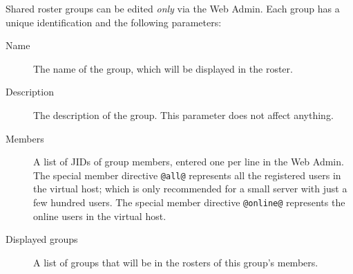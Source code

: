 \documentclass[a4paper,10pt]{book}
\newcommand{\term}[1]{\texttt{#1}}
\begin{document}
Shared roster groups can be edited \emph{only} via the Web Admin. Each group
has a unique identification and the following parameters:
\begin{description}
\item[Name] The name of the group, which will be displayed in the roster.
\item[Description] The description of the group. This parameter does not affect
  anything.
\item[Members] A list of JIDs of group members, entered one per line in
  the Web Admin.
  The special member directive \term{@all@}
  represents all the registered users in the virtual host;
  which is only recommended for a small server with just a few hundred users.
  The special member directive \term{@online@}
  represents the online users in the virtual host.
\item[Displayed groups] A list of groups that will be in the rosters of this
  group's members.
\end{description}
\end{document}
